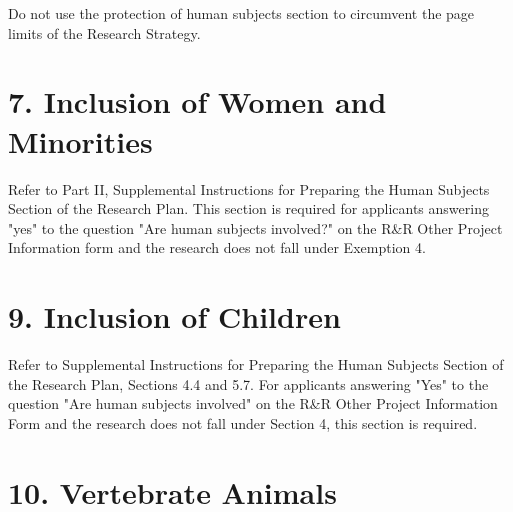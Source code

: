 \documentclass[11pt, notitlepage]{article} %
\begin{document}
Do not use the protection of human subjects section to circumvent the page limits of the Research Strategy.


\newpage

\section*{7. Inclusion of Women and Minorities}

Refer to Part II, Supplemental Instructions for Preparing the Human Subjects Section of the Research Plan. This section is required for applicants answering "yes" to the question "Are human subjects involved?" on the R\&R Other Project Information form and the research does not fall under Exemption 4.


\newpage

\section*{9. Inclusion of Children}

Refer to Supplemental Instructions for Preparing the Human Subjects Section of the Research Plan, Sections 4.4 and 5.7. For applicants answering "Yes" to the question "Are human subjects involved" on the R\&R Other Project Information Form and the research does not fall under Section 4, this section is required.


\newpage

\section*{10. Vertebrate Animals}
\end{document}
